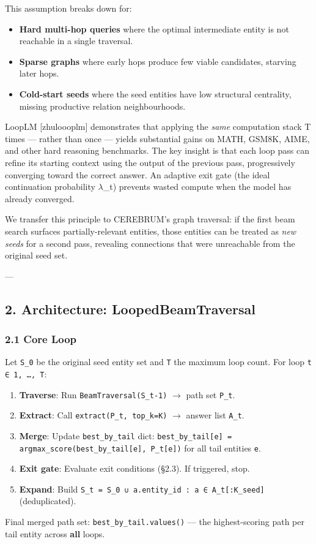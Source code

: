 This assumption breaks down for:
\begin{itemize}
\item \textbf{Hard multi-hop queries} where the optimal inter\-mediate entity is not reachable in a single traversal.
\item \textbf{Sparse graphs} where early hops produce few viable candidates, starving later hops.
\item \textbf{Cold-start seeds} where the seed entities have low structural centrality, missing productive relation neigh\-bourhoods.

\end{itemize}
LoopLM [zhu\-loooplm] demon\-strates that applying the \textit{same} computation stack T times — rather than once — yields substantial gains on MATH, GSM8K, AIME, and other hard reasoning benchmarks. The key insight is that each loop pass can refine its starting context using the output of the previous pass, progr\-essively converging toward the correct answer. An adaptive exit gate (the ideal conti\-nuation probability $\lambda$\_t) prevents wasted compute when the model has already converged.

We transfer this principle to CEREBRUM's graph traversal: if the first beam search surfaces partially-relevant entities, those entities can be treated as \textit{new seeds} for a second pass, revealing connections that were unreachable from the original seed set.

---

\subsection{2. Archit\-ecture: LoopedBeamTraversal}

\subsubsection{2.1 Core Loop}

Let \texttt{S\_0} be the original seed entity set and \texttt{T} the maximum loop count. For loop \texttt{t ∈ {1, …, T}}:

\begin{enumerate}
\item \textbf{Traverse}: Run \texttt{BeamTraversal(S\_{t-1})} $\to$ path set \texttt{P\_t}.
\item \textbf{Extract}: Call \texttt{extract(P\_t, top\_k=K)} $\to$ answer list \texttt{A\_t}.
\item \textbf{Merge}: Update \texttt{best\_by\_tail} dict: \texttt{best\_by\_tail[e] = argmax\_score(best\_by\_tail[e], P\_t[e])} for all tail entities \texttt{e}.
\item \textbf{Exit gate}: Evaluate exit conditions (§2.3). If triggered, stop.
\item \textbf{Expand}: Build \texttt{S\_t = S\_0 ∪ {a.entity\_id : a ∈ A\_t[:K\_seed]}} (dedup\-licated).

\end{enumerate}
Final merged path set: \texttt{best\_by\_tail.values()} — the highest-scoring path per tail entity across \textbf{all} loops.

